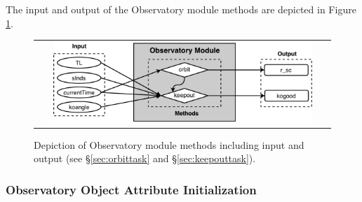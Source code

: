 \documentclass[cleanfoot]{asme2ej}
\newcommand{\reffig}[1]{Figure \ref{#1}}
\begin{document}
The input and output of the Observatory module methods are depicted in \reffig{fig:observatorymodule}.

\begin{figure}[ht]
    \begin{center}
        \begin{tabular}{c}
             \includegraphics[width=0.9\textwidth]{observatory4}
        \end{tabular}
    \end{center}
    \caption{\label{fig:observatorymodule} Depiction of Observatory module methods including input and output (see \S\ref{sec:orbittask} and \S\ref{sec:keepouttask}).}
\end{figure}

\label{sec:observatory}
\subsubsection{Observatory Object Attribute Initialization}
\end{document}
